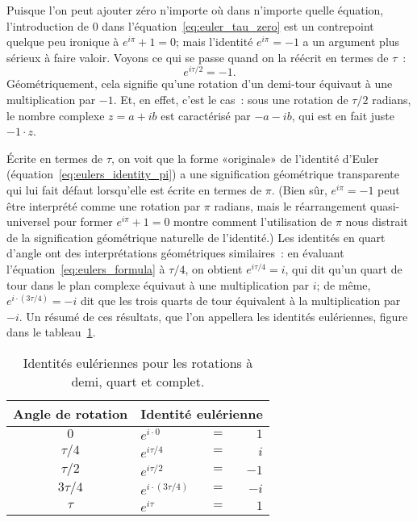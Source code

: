 Puisque l'on peut ajouter zéro n'importe où dans n'importe quelle équation,
l'introduction de $0$ dans l'équation~\eqref{eq:euler_tau_zero} est un
contrepoint quelque peu ironique à $e^{i\pi} + 1 = 0$\ns; mais l'identité
$e^{i\pi} = -1$ a un argument plus sérieux à faire valoir. Voyons ce qui
se passe quand on la réécrit en termes de $\tau$~:
\[
e^{i\tau /2} = -1.
\]
Géométriquement, cela signifie qu'une rotation d'un demi-tour équivaut à une
multiplication par $-1$. Et, en effet, c'est le cas~: sous une rotation de
$\tau/2$ radians, le nombre complexe $z = a + ib$ est caractérisé par $-a - ib$, qui
est en fait juste $-1\cdot z$.

Écrite en termes de $\tau$, on voit que la forme «\ns originale\ns » de l'identité
d'Euler (équation~\eqref{eq:eulers_identity_pi}) a une signification
géométrique transparente qui lui fait défaut lorsqu'elle est écrite en termes de
$\pi$. (Bien sûr, $e^{i\pi} = -1$ peut être interprété comme une rotation par
$\pi$ radians, mais le réarrangement quasi-universel pour former $e^{i\pi} + 1 =
0$ montre comment l'utilisation de $\pi$ nous distrait de la signification
géométrique naturelle de l'identité.) Les identités en quart d'angle ont des
interprétations géométriques similaires~: en évaluant
l'équation~\eqref{eq:eulers_formula} à $\tau/4$, on obtient $e^{i\tau/4} = i$,
qui dit qu'un quart de tour dans le plan complexe équivaut à une multiplication
par $i$\ns; de même, $e^{i\cdot(3\tau/4)} = -i$ dit que les trois quarts de tour
équivalent à la multiplication par $-i$. Un résumé de ces résultats, que l'on
appellera les identités eulériennes, figure dans le
tableau~\ref{table:eulerian_identities}.

\begin{table}
\begin{center}
\begin{tabular}{cllr}
Angle de rotation & \multicolumn{3}{c}{Identité eulérienne} \\ \hline
$0$ & $e^{i\cdot0}$ & $ = $ & $1$ \smallskip \\
$\tau/4$ & $e^{i\tau/4}$ & $ = $ & $i$ \smallskip \\
$\tau/2$ & $e^{i\tau/2}$ & $ = $ & $-1$ \smallskip \\
$3\tau/4$ & $e^{i\cdot(3\tau/4)}$ & $ = $ & $-i$ \smallskip \\
$\tau$ & $e^{i\tau}$ & $ = $ & $1$
\end{tabular}
\end{center}
\caption{Identités eulériennes pour les rotations à demi, quart et
complet.\label{table:eulerian_identities}}
\end{table}

